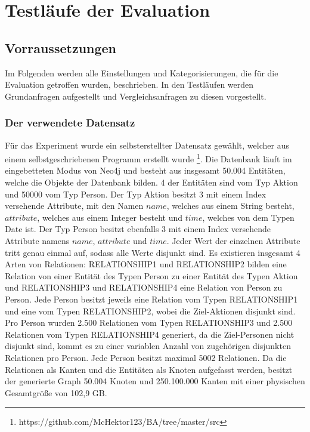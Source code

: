 
\chapter{Testläufe der Evaluation} %

\label{Kapitel3} %

\section{Vorraussetzungen}
Im Folgenden werden alle Einstellungen und Kategorisierungen, die für die Evaluation getroffen wurden, beschrieben. In den Testläufen werden Grundanfragen aufgestellt und Vergleichsanfragen zu diesen vorgestellt.  
\subsection{Der verwendete Datensatz}
Für das Experiment wurde ein selbsterstellter Datensatz gewählt, welcher aus einem selbstgeschriebenen Programm erstellt wurde \footnote{https://github.com/McHektor123/BA/tree/master/src}. Die Datenbank läuft im eingebetteten Modus von Neo4j und besteht aus insgesamt 50.004 Entitäten, welche die Objekte der Datenbank bilden. 4 der Entitäten sind  vom Typ Aktion und 50000 vom Typ Person. Der Typ Aktion besitzt 3 mit einem Index versehende Attribute, mit den Namen $name$, welches aus einem String besteht, $attribute$, welches aus einem Integer besteht und $time$, welches von dem Typen Date ist. Der Typ Person besitzt ebenfalls 3 mit einem Index versehende Attribute namens $name$, $attribute$ und $time$. Jeder Wert der einzelnen Attribute tritt genau einmal auf, sodass alle Werte disjunkt sind. \newline
Es existieren insgesamt 4 Arten von Relationen: RELATIONSHIP1 und RELATIONSHIP2 bilden eine Relation von einer Entität des Typen Person zu einer Entität des Typen Aktion  und  RELATIONSHIP3 und RELATIONSHIP4 eine Relation von Person zu Person. Jede Person besitzt jeweils eine Relation vom Typen RELATIONSHIP1 und eine vom Typen RELATIONSHIP2, wobei die Ziel-Aktionen disjunkt sind. Pro Person wurden 2.500 Relationen vom Typen RELATIONSHIP3 und 2.500 Relationen vom Typen RELATIONSHIP4 generiert, da die Ziel-Personen nicht disjunkt sind, kommt es zu einer variablen Anzahl von zugehörigen disjunkten Relationen pro Person. Jede Person besitzt maximal 5002 Relationen. Da die Relationen als Kanten und die Entitäten als Knoten aufgefasst werden, besitzt der generierte Graph 50.004 Knoten und 250.100.000 Kanten mit einer physischen Gesamtgröße von 102,9 GB. 
